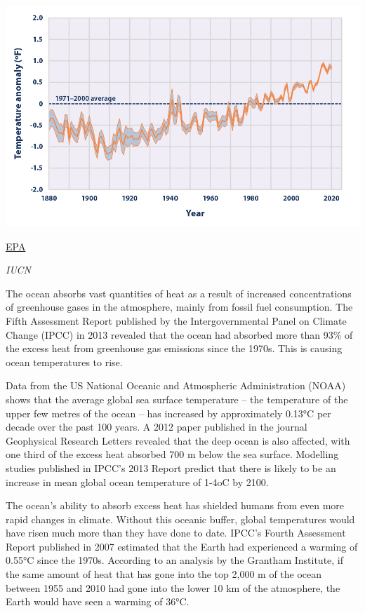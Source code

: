 \documentclass[
]{book}
\begin{document}
\includegraphics{fig/sea_surface_tmp_2.png}

\href{https://www.epa.gov/climate-indicators/climate-change-indicators-sea-surface-temperature}{EPA}

\emph{IUCN}

The ocean absorbs vast quantities of heat as a result of increased concentrations of greenhouse gases in the atmosphere, mainly from fossil fuel consumption. The Fifth Assessment Report published by the Intergovernmental Panel on Climate Change (IPCC) in 2013 revealed that the ocean had absorbed more than 93\% of the excess heat from greenhouse gas emissions since the 1970s. This is causing ocean temperatures to rise.

Data from the US National Oceanic and Atmospheric Administration (NOAA) shows that the average global sea surface temperature -- the temperature of the upper few metres of the ocean -- has increased by approximately 0.13°C per decade over the past 100 years. A 2012 paper published in the journal Geophysical Research Letters revealed that the deep ocean is also affected, with one third of the excess heat absorbed 700 m below the sea surface. Modelling studies published in IPCC's 2013 Report predict that there is likely to be an increase in mean global ocean temperature of 1-4oC by 2100.

The ocean's ability to absorb excess heat has shielded humans from even more rapid changes in climate. Without this oceanic buffer, global temperatures would have risen much more than they have done to date. IPCC's Fourth Assessment Report published in 2007 estimated that the Earth had experienced a warming of 0.55°C since the 1970s. According to an analysis by the Grantham Institute, if the same amount of heat that has gone into the top 2,000 m of the ocean between 1955 and 2010 had gone into the lower 10 km of the atmosphere, the Earth would have seen a warming of 36°C.
\end{document}
